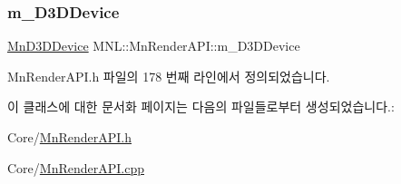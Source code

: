 \subsubsection{\texorpdfstring{m\+\_\+\+D3\+D\+Device}{m\_D3DDevice}}
{\footnotesize\ttfamily \hyperlink{class_m_n_l_1_1_mn_d3_d_device}{Mn\+D3\+D\+Device} M\+N\+L\+::\+Mn\+Render\+A\+P\+I\+::m\+\_\+\+D3\+D\+Device\hspace{0.3cm}{\ttfamily [private]}}



Mn\+Render\+A\+P\+I.\+h 파일의 178 번째 라인에서 정의되었습니다.



이 클래스에 대한 문서화 페이지는 다음의 파일들로부터 생성되었습니다.\+:\begin{DoxyCompactItemize}
\item 
Core/\hyperlink{_mn_render_a_p_i_8h}{Mn\+Render\+A\+P\+I.\+h}\item 
Core/\hyperlink{_mn_render_a_p_i_8cpp}{Mn\+Render\+A\+P\+I.\+cpp}\end{DoxyCompactItemize}
